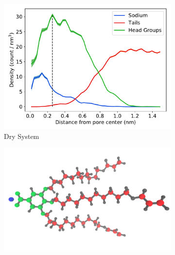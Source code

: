 \documentclass{article}
\begin{document}
  \begin{figure}[!htb]
  \centering
  \begin{subfigure}{0.45\textwidth}
  \includegraphics[width=\textwidth]{component_density_dry.pdf}
  \caption{Dry System}\label{fig:component_density_dry}
  \end{subfigure}
  \begin{subfigure}{0.45\textwidth}
  \vspace{-0.5cm}
  \includegraphics[width=\textwidth]{monomer_color_coded.pdf}
  \label{fig:monomer_color_coded}
  \end{subfigure}
  \begin{subfigure}{0.45\textwidth}

\end{subfigure}
\end{figure}
\end{document}
